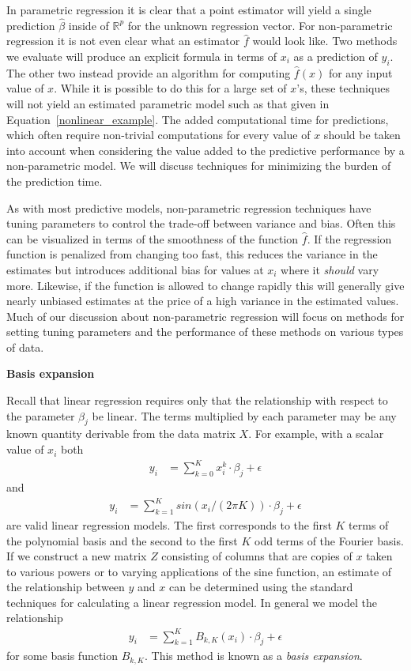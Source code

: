 \documentclass[12pt,hidelinks]{article}
\numberwithin{equation}{section}
\begin{document}
In parametric regression it is clear that a point estimator will yield
a single prediction $\widehat{\beta}$ inside of $\mathbb{R}^p$ for the
unknown regression vector. For non-parametric regression it is not even
clear what an estimator $\widehat{f}$ would look like. Two methods we
evaluate will produce an explicit formula in terms of $x_i$ as a prediction
of $y_i$. The other two instead provide an algorithm for computing
$\widehat{f}(x)$ for any input value of $x$. While it is
possible to do this for a large set of $x$'s, these techniques
will not yield an estimated
parametric model such as that given in Equation~\ref{nonlinear_example}.
The added computational time for predictions, which often require
non-trivial computations for every value of $x$ should be taken into
account when considering the value added to the predictive performance
by a non-parametric model. We will discuss techniques for minimizing
the burden of the prediction time.

As with most predictive models, non-parametric regression techniques
have tuning parameters to control the trade-off between variance and
bias. Often this can be visualized in terms of the smoothness of the
function $\widehat{f}$. If the regression function is penalized from
changing too fast, this reduces the variance in the estimates but
introduces additional bias for values at $x_i$ where it \textit{should}
vary more. Likewise, if the function is allowed to change rapidly this
will generally give nearly unbiased estimates at the price of a high
variance in the estimated values. Much of our discussion about non-parametric
regression will focus on methods for setting tuning parameters and the
performance of these methods on various types of data.

\textbf{Basis expansion}

Recall that linear regression requires
only that the relationship with respect to the parameter $\beta_j$ be linear.
The terms multiplied by each parameter may be any known quantity
derivable from the data matrix $X$. For example, with a scalar value
of $x_i$ both
\begin{align}
y_i &= \sum_{k = 0}^K x_i^k \cdot \beta_j + \epsilon
\end{align}
and
\begin{align}
y_i &= \sum_{k = 1}^K sin(x_i / (2\pi K)) \cdot \beta_j + \epsilon
\end{align}
are valid linear regression models. The first corresponds to the first
$K$ terms of the polynomial basis and the second to the first $K$ odd
terms of the Fourier basis. If we construct a new matrix $Z$ consisting
of columns that are copies of $x$ taken to various powers or to varying
applications of the sine function, an estimate of the relationship
between $y$ and $x$ can be determined using the standard techniques
for calculating a linear regression model. In general we model the
relationship
\begin{align}
y_i &= \sum_{k = 1}^K B_{k, K}(x_i) \cdot \beta_j + \epsilon
\end{align}
for some basis function $B_{k,K}$. This method is known as a
\textit{basis expansion}.
\end{document}
